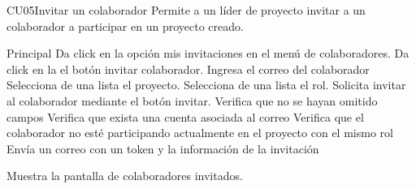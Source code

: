 
% 



	\begin{UseCase}{CU05}{Invitar un colaborador}{
		Permite a un líder de proyecto invitar a un colaborador a participar en un proyecto creado.
	}
	\end{UseCase}
	\begin{UCtrayectoria}{Principal}
		\UCpaso[\UCactor] Da click en la opción mis invitaciones en el menú de colaboradores. 
		\UCpaso[\UCactor] Da click en la el botón invitar colaborador.
        \UCpaso[\UCactor]  Ingresa el correo del colaborador \label{crear}
       \UCpaso[\UCactor] Selecciona de una lista el proyecto.
       \UCpaso[\UCactor]  Selecciona de una lista el rol.
      \UCpaso[\UCactor]   Solicita invitar al colaborador mediante el botón invitar.  
      \UCpaso[\UCactor] Verifica que no se hayan omitido campos   
     \UCpaso[\UCactor] Verifica que exista una cuenta asociada al correo
       \UCpaso[\UCactor]Verifica que el colaborador no esté participando actualmente en el proyecto con el mismo rol
      \UCpaso  Envía un correo con un token y la información de la invitación
      
       \UCpaso   Muestra la pantalla de  colaboradores invitados.
	\end{UCtrayectoria}

